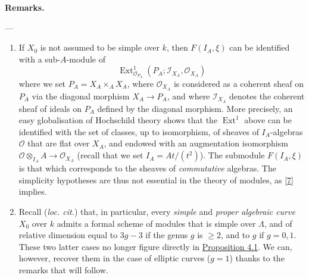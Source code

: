 \documentclass{article}
\newenvironment{rmenv}[1]
  {\phantomsection\par\smallskip\noindent\textbf{#1.}\rmfamily}
  {\par\smallskip}
\theoremstyle{definition}
\theoremstyle{definition}
\theoremstyle{definition}
\theoremstyle{definition}
\theoremstyle{remark}
\begin{document}
\begin{rmenv}{Remarks}

---

\begin{enumerate}
\def\labelenumi{\arabic{enumi}.}
\item
  If \(X_0\) is not assumed to be simple over \(k\), then \(F(I_A,\xi)\) can be identified with a sub-\(A\)-module of
  \[
   \operatorname{Ext}_{{\mathscr{O}}_{P_A}}^1(P_A;{\mathscr{I}}_{X_A},{\mathscr{O}}_{X_A})
    \]
  where we set \(P_A=X_A\times_A X_A\), where \({\mathscr{O}}_{X_A}\) is considered as a coherent sheaf on \(P_A\) via the diagonal morphism \(X_A\to P_A\), and where \({\mathscr{I}}_{X_A}\) denotes the coherent sheaf of ideals on \(P_A\) defined by the diagonal morphism.
  More precisely, an easy globalisation of Hochschild theory shows that the \(\operatorname{Ext}^1\) above can be identified with the set of classes, up to isomorphism, of sheaves of \(I_A\)-algebras \({\mathscr{O}}\) that are flat over \(X_A\), and endowed with an augmentation isomorphism \({\mathscr{O}}\otimes_{I_A}A\to{\mathscr{O}}_{X_A}\) (recall that we set \(I_A=At/(t^2)\)).
  The submodule \(F(I_A,\xi)\) is that which corresponds to the sheaves of \emph{commutative} algebras.
  The simplicity hypotheses are thus not essential in the theory of modules, as {[}\protect\hyperlink{ref-Gro1958a}{7}{]} implies.
\item
  Recall (\emph{loc. cit.}) that, in particular, every \emph{simple} and \emph{proper algebraic curve} \(X_0\) over \(k\) admits a formal scheme of modules that is simple over \(\Lambda\), and of relative dimension equal to \(3g-3\) if the genus \(g\) is \(\geqslant 2\), and to \(g\) if \(g=0,1\).
  These two latter cases no longer figure directly in \protect\hyperlink{fga-3-ii-section-C.4-proposition-4}{Proposition 4.1}.
  We can, however, recover them in the case of elliptic curves (\(g=1\)) thanks to the remarks that will follow.
\end{enumerate}

\end{rmenv}
\end{document}
